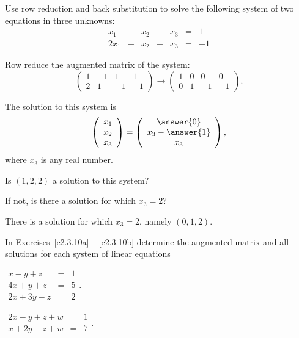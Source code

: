 \documentclass{ximera}
\begin{document}
\begin{exercise} \label{c2.3.9}
Use row reduction and back substitution to solve the following
system of two equations in three unknowns:
\[
\begin{array}{rcrcrcrc}
 x_1 & - & x_2 & + & x_3 & = & 1 \\
2x_1 & + & x_2 & - & x_3 & = & -1
\end{array}
\]
\begin{hint}
   Row reduce the augmented matrix of the system:
\[
\left(\begin{array}{rrr|r} 1 & -1 & 1 & 1 \\ 2 & 1 & -1 & -1\end{array}\right)
\longrightarrow
\left(\begin{array}{rrr|r} 1 & 0 & 0 & 0 \\ 0 & 1 & -1 & -1\end{array}\right).
\]
\end{hint}
\begin{prompt}
  The solution to this system is
\[
\left(\begin{array}{c} x_1 \\ x_2 \\ x_3\end{array}\right) =
\left(\begin{array}{c} \answer{0} \\ x_3 - \answer{1} \\ x_3\end{array}\right),
\]
where $x_3$ is any real number.
\end{prompt}
Is $(1,2,2)$ a solution to this system?
\begin{multipleChoice}
\end{multipleChoice}
If not, is there a solution for which $x_3=2$?
\begin{multipleChoice}
\end{multipleChoice}
\begin{hint}
  There is a solution for which $x_3 = 2$, namely $(0,1,2)$.
\end{hint}
\end{exercise}

\noindent In Exercises~\ref{c2.3.10a} -- \ref{c2.3.10b} determine the
augmented matrix and all solutions for each system of linear equations
\begin{exercise} \label{c2.3.10a}
$\begin{array}{rcl}
x-y+z & = & 1 \\
4x+y+z & = & 5 \\
   2x+3y-z & = & 2 \end{array}$.
\end{exercise}
\begin{exercise} \label{c2.3.10b}
$\begin{array}{rcl}
2x-y+z+w & = & 1\\
   x+2y-z+w & = & 7 \end{array}$.
\end{exercise}
\end{document}
